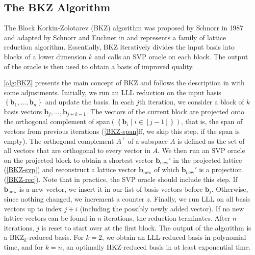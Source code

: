 \subsection{The BKZ Algorithm} \label{sec:BKZ}

The Block Korkin-Zolotarev (BKZ) algorithm was proposed by Schnorr in 1987 and adapted by Schnorr and Euchner in \cite{SE91} and represents a family of lattice reduction algorithm. Essentially, BKZ iteratively divides the input basis into blocks of a lower dimension $k$ and calls an SVP oracle on each block. The output of the oracle is then used to obtain a basis of improved quality.

\cref{alg:BKZ} presents the main concept of BKZ and follows the description in \cite{CN11} with some adjustments. Initially, we run an LLL reduction on the input basis $\left\{\mathbf{b}_1, \dots, \mathbf{b}_{n}\right\}$ and update the basis. In each $j$th iteration, we consider a block of $k$ basis vectors $\mathbf{b}_j, \dots, \mathbf{b}_{j+k-1}$. The vectors of the current block are projected onto the orthogonal complement of $\text{span}\left(\left\{\mathbf{b}_i \mid i \in [j-1]\right\}\right)$, that is, the span of vectors from previous iterations (\cref{BKZ-span}ff, we skip this step, if the span is empty). The orthogonal complement $A^\perp$ of a subspace $A$ is defined as the set of all vectors that are orthogonal to every vector in $A$. We then run an SVP oracle on the projected block to obtain a shortest vector $\mathbf{b}_\text{new}'$ in the projected lattice (\cref{BKZ-svp}) and reconstruct a lattice vector $\mathbf{b}_\text{new}$ of which $\mathbf{b}_\text{new}'$ is a projection (\cref{BKZ-rec}). Note that in practice, the SVP oracle should include this step. If $\mathbf{b}_\text{new}$ is a new vector, we insert it in our list of basis vectors before $\mathbf{b}_j$. Otherwise, since nothing changed, we increment a counter $z$. Finally, we run LLL on all basis vectors up to index $j+i$ (including the possibly newly added vector). If no new lattice vectors can be found in $n$ iterations, the reduction terminates. After $n$ iterations, $j$ is reset to start over at the first block. The output of the algorithm is a BKZ$_k$-reduced basis. For $k=2$, we obtain an LLL-reduced basis in polynomial time, and for $k=n$, an optimally HKZ-reduced basis in at least exponential time.%


